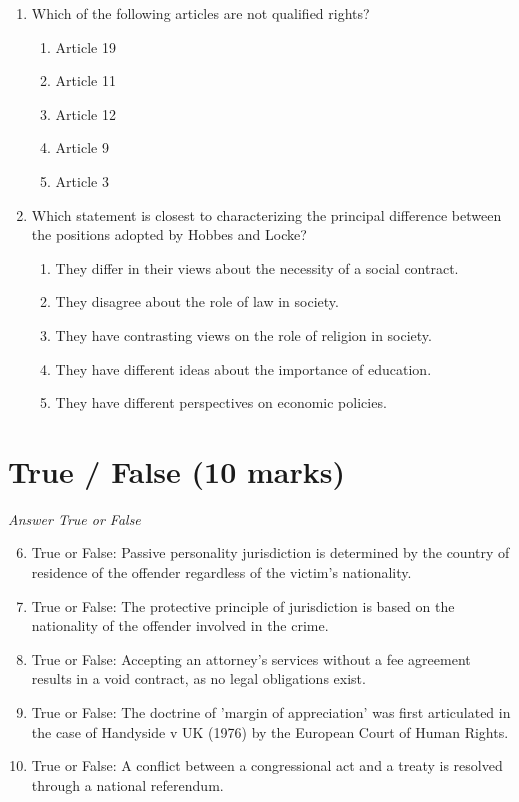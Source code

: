 \documentclass[12pt]{article}
\begin{document}
\begin{enumerate}[label=\arabic*.]
\begin{enumerate}[label=(\alph*)]
\end{enumerate}
\item Which of the following articles are not qualified rights?
\begin{enumerate}[label=(\alph*)]
    \item Article 19
    \item Article 11
    \item Article 12
    \item Article 9
    \item Article 3
\end{enumerate}
\item Which statement is closest to characterizing the principal difference between the positions adopted by Hobbes and Locke?
\begin{enumerate}[label=(\alph*)]
    \item They differ in their views about the necessity of a social contract.
    \item They disagree about the role of law in society.
    \item They have contrasting views on the role of religion in society.
    \item They have different ideas about the importance of education.
    \item They have different perspectives on economic policies.
\end{enumerate}
\end{enumerate}

\section*{True / False (10 marks)}
\textit{Answer True or False}
\begin{enumerate}[label=\arabic*.]
\setcounter{enumi}{5}
\item True or False: Passive personality jurisdiction is determined by the country of residence of the offender regardless of the victim's nationality.
\item True or False: The protective principle of jurisdiction is based on the nationality of the offender involved in the crime.
\item True or False: Accepting an attorney's services without a fee agreement results in a void contract, as no legal obligations exist.
\item True or False: The doctrine of 'margin of appreciation' was first articulated in the case of Handyside v UK (1976) by the European Court of Human Rights.
\item True or False: A conflict between a congressional act and a treaty is resolved through a national referendum.
\end{enumerate}
\end{document}
